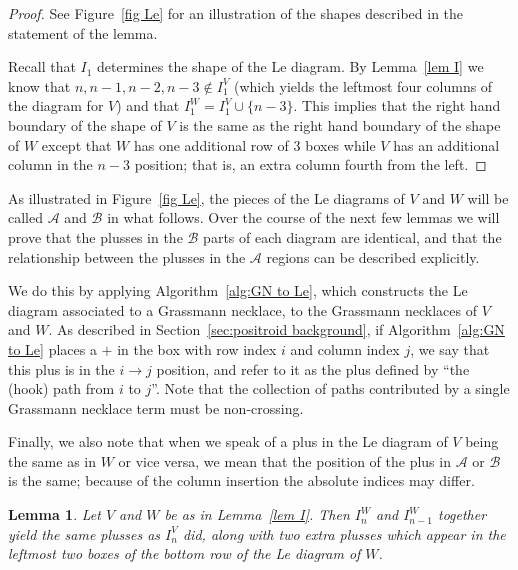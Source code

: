 \documentclass[11pt]{article}
\newtheorem{lem}[thm]{Lemma}
\theoremstyle{remark}
\theoremstyle{definition}
\begin{document}
\begin{proof}
See Figure~\ref{fig Le} for an illustration of the shapes described in the statement of the lemma.

Recall that $I_1$ determines the shape of the Le diagram. By Lemma~\ref{lem I} we know that
\newline ${n,n-1,n-2, n-3 \not\in I_1^{V}}$ (which yields the leftmost four columns of the diagram for $V$) and that $I_1^{W} = I_1^{V}\cup \{n-3\}$. This implies that the right hand boundary of the shape of $V$ is the same as the right hand boundary of the shape of $W$ except that $W$ has one additional row of 3 boxes while $V$ has an additional column in the $n-3$ position; that is, an extra column fourth from the left.
\end{proof}

As illustrated in Figure~\ref{fig Le}, the pieces of the Le diagrams of $V$ and $W$ will be called $\mathcal{A}$ and $\mathcal{B}$ in what follows. Over the course of the next few lemmas we will prove that the plusses in the $\mathcal{B}$ parts of each diagram are identical, and that the relationship between the plusses in the $\mathcal{A}$ regions can be described explicitly.


We do this by applying Algorithm~\ref{alg:GN to Le}, which constructs the Le diagram associated to a Grassmann necklace, to the Grassmann necklaces of $V$ and $W$. As described in Section~\ref{sec:positroid background}, if Algorithm~\ref{alg:GN to Le} places a $+$ in the box with row index $i$ and column index $j$, we say that this plus is in the $i \rightarrow j$ position, and refer to it as the plus defined by ``the (hook) path from $i$ to $j$''. Note that the collection of paths contributed by a single Grassmann necklace term  must be non-crossing.



Finally, we also note that when we speak of a plus in the Le diagram of $V$ being the same as in $W$ or vice versa, we mean that the position of the plus in $\mathcal{A}$ or $\mathcal{B}$ is the same; because of the column insertion the absolute indices may differ.




\begin{lem}\label{lem n and n-1}
Let $V$ and $W$ be as in Lemma~\ref{lem I}.
Then $I_n^{W}$ and $I_{n-1}^{W}$ together yield the same plusses as $I_n^{V}$ did, along with two extra plusses which appear in the leftmost two boxes of the bottom row of the Le diagram of $W$.
\end{lem}
\end{document}
